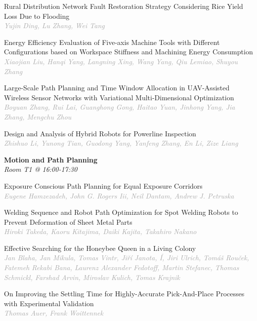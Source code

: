 \begin{multicols*}{2}
\small Rural Distribution Network Fault Restoration Strategy Considering Rice Yield Loss Due to Flooding\\ 
\footnotesize \textcolor{darkgray}{\textit{Yujin Ding, Lu  Zhang, Wei  Tang}}

\small Energy Efficiency Evaluation of Five-axis Machine Tools with Different Configurations based on Workspace Stiffness and Machining Energy Consumption\\ 
\footnotesize \textcolor{darkgray}{\textit{Xiaojian Liu, Hanqi  Yang, Langning  Xing, Wang  Yang, Qiu  Lemiao, Shuyou  Zhang}}

\small Large-Scale Path Planning and Time Window Allocation in UAV-Assisted Wireless Sensor Networks with Variational Multi-Dimensional Optimization\\ 
\footnotesize \textcolor{darkgray}{\textit{Boyuan Zhang, Rui  Lai, Guanghong  Gong, Haitao  Yuan, Jinhong  Yang, Jia  Zhang, Mengchu  Zhou}}

\small Design and Analysis of Hybrid Robots for Powerline Inspection\\ 
\footnotesize \textcolor{darkgray}{\textit{Zhishuo Li, Yunong  Tian, Guodong  Yang, Yanfeng  Zhang, En  Li, Zize  Liang}}

\normalsize \textbf{Motion and Path Planning}\\
\small \textit{Room T1 @ 16:00-17:30}

\small Exposure Conscious Path Planning for Equal Exposure Corridors\\ 
\footnotesize \textcolor{darkgray}{\textit{Eugene Hamzezadeh, John G.  Rogers Iii, Neil  Dantam, Andrew J.  Petruska}}

\small Welding Sequence and Robot Path Optimization for Spot Welding Robots to Prevent Deformation of Sheet Metal Parts\\ 
\footnotesize \textcolor{darkgray}{\textit{Hiroki Takeda, Kaoru  Kitajima, Daiki  Kajita, Takahiro  Nakano}}

\small Effective Searching for the Honeybee Queen in a Living Colony\\ 
\footnotesize \textcolor{darkgray}{\textit{Jan Blaha, Jan  Mikula, Tomas  Vintr, Jiří Janota, Í, Jiri Ulrich,  Tomáš Rouček, Fatemeh  Rekabi Bana, Laurenz Alexander  Fedotoff, Martin  Stefanec, Thomas  Schmickl, Farshad  Arvin, Miroslav  Kulich, Tomas  Krajnik}}

\small On Improving the Settling Time for Highly-Accurate Pick-And-Place Processes with Experimental Validation\\ 
\footnotesize \textcolor{darkgray}{\textit{Thomas Auer, Frank  Woittennek}}


\end{multicols*}
